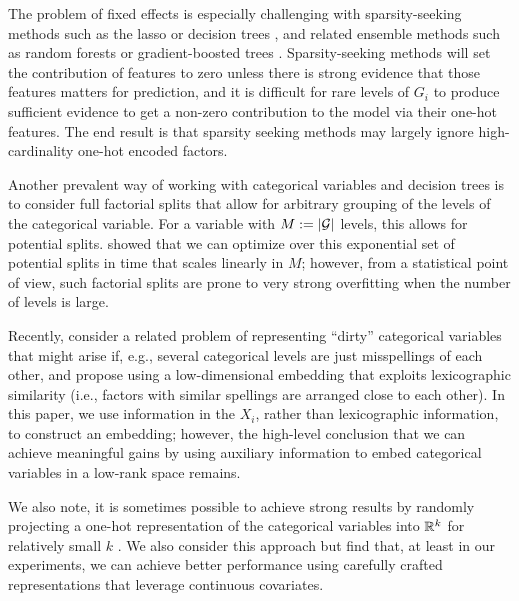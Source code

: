 \documentclass{article}
\theoremstyle{plain}
\theoremstyle{definition}
\theoremstyle{remark}
\begin{document}
The problem of fixed effects is especially challenging with sparsity-seeking methods such as the
lasso \citep{hastie2015statistical} or decision trees \citep{breiman1984classification}, and related
ensemble methods such as random forests \citep{breiman2001random} or gradient-boosted
trees \citep{friedman2001greedy}. Sparsity-seeking methods will set the contribution of features
to zero unless there is strong evidence that those features matters for prediction, and it is difficult
for rare levels of $G_i$ to produce sufficient evidence to get a non-zero contribution to the model
via their one-hot features. The end result is that sparsity seeking methods may largely ignore high-cardinality
one-hot encoded factors.

Another prevalent way of working with categorical variables and decision trees
is to consider full factorial splits that allow for arbitrary grouping of the levels of the categorical
variable. For a variable with $M := \left\lvert\mathcal{G}\right\rvert$ levels, this allows
for  potential splits. \citet{breiman1984classification} showed that
we can optimize over this exponential set of potential splits in time that scales linearly in $M$;
however, from a statistical point of view, such factorial splits are prone to very strong overfitting
when the number of levels is large.

Recently, \citet{cerda2018similarity} consider a related problem of representing ``dirty'' categorical
variables that might arise if, e.g., several categorical levels are just misspellings of each other, and
propose using a low-dimensional embedding that exploits lexicographic similarity (i.e., factors with
similar spellings are arranged close to each other). In this paper, we use information in the $X_i$,
rather than lexicographic information, to construct an embedding; however, the high-level conclusion
that we can achieve meaningful gains by using auxiliary information to embed categorical variables in
a low-rank space remains.

We also note, it is sometimes possible to achieve strong results by randomly projecting a one-hot
representation of the categorical variables into $\mathbb{R}^k$ for relatively small $k$ \citep{rahimi2008random}. We also
consider this approach but find that, at least in our experiments, we can achieve better
performance using carefully crafted representations that leverage continuous covariates.
\end{document}
